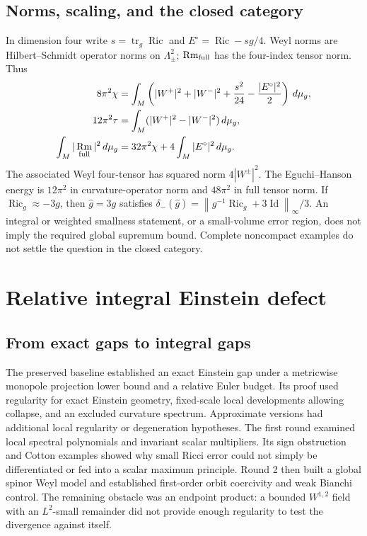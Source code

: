 \documentclass[11pt,a4paper]{article}
\theoremstyle{definition}
\theoremstyle{remark}
\DeclareMathOperator{\Ric}{Ric}
\DeclareMathOperator{\Rm}{Rm}
\DeclareMathOperator{\tr}{tr}
\DeclareMathOperator{\Id}{Id}
\newcommand{\dd}{\,d\mu_g}
\newcommand{\norm}[1]{\left\|#1\right\|}
\numberwithin{equation}{section}
\begin{document}
\subsection{Norms, scaling, and the closed category}\label{sub:conventions}
In dimension four write $s=\tr_g\Ric$ and
$E^\circ=\Ric-sg/4$. Weyl norms are Hilbert--Schmidt operator norms on
$\Lambda^2_\pm$; $\Rm_{\rm full}$ has the four-index tensor norm. Thus
\begin{align}
8\pi^2\chi&=\int_M\left(|W^+|^2+|W^-|^2+
                   \frac{s^2}{24}-\frac{|E^\circ|^2}{2}\right)\dd,
                                                        \label{eq:CGB}\\
12\pi^2\tau&=\int_M(|W^+|^2-|W^-|^2)\dd,\label{eq:signature}\\
\int_M|\Rm_{\rm full}|^2\dd&=32\pi^2\chi+
                                      4\int_M|E^\circ|^2\dd.
                                                        \label{eq:full-energy}
\end{align}
The associated Weyl four-tensor has squared norm $4|W^\pm|^2$.
The Eguchi--Hanson energy is $12\pi^2$ in curvature-operator norm and
$48\pi^2$ in full tensor norm. If $\Ric_g\approx-3g$, then
$\widehat g=3g$ satisfies
$\delta_-(\widehat g)=\norm{g^{-1}\Ric_g+3\Id}_\infty/3$.
An integral or weighted smallness statement, or a small-volume error
region, does not imply the required global supremum bound. Complete
noncompact examples do not settle the question in the closed category.

\section{Relative integral Einstein defect}\label{sec:energy}
\subsection{From exact gaps to integral gaps}\label{sub:analytic-change}
The preserved baseline established an exact Einstein gap under a
metricwise monopole projection lower bound and a relative Euler budget.
Its proof used regularity for exact Einstein geometry, fixed-scale local
developments allowing collapse, and an excluded curvature spectrum.
Approximate versions had additional local regularity or degeneration
hypotheses. The first round examined local spectral polynomials and
invariant scalar multipliers. Its sign obstruction and Cotton examples
showed why small Ricci error could not simply be differentiated or fed
into a scalar maximum principle. Round 2 then built a global spinor Weyl
model and established first-order orbit coercivity and weak Bianchi
control. The remaining obstacle was an endpoint product: a bounded
$W^{1,2}$ field with an $L^2$-small remainder did not provide enough
regularity to test the divergence against itself.
\end{document}
